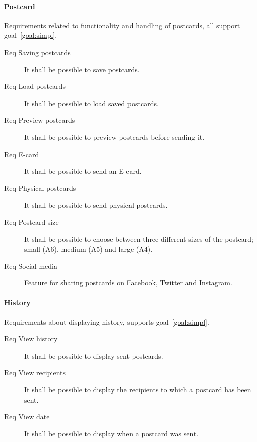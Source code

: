 \documentclass[10pt,a4paper]{article}
\begin{document}
\paragraph{Postcard}
Requirements related to functionality and handling of postcards, all support goal~\ref{goal:simpl}.


\begin{description}
	\item [Req \thesubsubsection {} Saving postcards] It shall be possible to save postcards.

	\item [Req \thesubsubsection {} Load postcards] It shall be possible to load saved postcards.
	
	
	\item [Req \thesubsubsection {} Preview postcards] It shall be possible to preview postcards before sending it.
	
	
	\item [Req \thesubsubsection {} E-card] It shall be possible to send an E-card.
	
	\item [Req \thesubsubsection {} Physical postcards] It shall be possible to send physical postcards.
	
	
	\item [Req \thesubsubsection {} Postcard size] It shall be possible to choose between three different sizes of the postcard; small (A6), medium (A5) and large (A4).
	

	
	\item [Req \thesubsubsection {} Social media] Feature for sharing postcards on Facebook, Twitter and Instagram.
\end{description}

\paragraph{History}
Requirements about displaying history, supports goal~\ref{goal:simpl}.
\begin{description}
\item [Req \thesubsubsection {} View history] It shall be possible to display sent postcards.

\item [Req \thesubsubsection {} View recipients] It shall be possible to display the recipients to which a postcard has been sent.

\item [Req \thesubsubsection {} View date] It shall be possible to display when a postcard was sent. 


\end{description}
\end{document}
